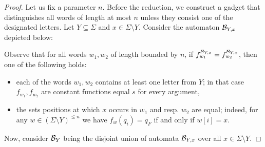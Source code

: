 \NPHardnessOfClash*
\begin{proof}
Let us fix a parameter $n$. Before the reduction, we construct a gadget that distinguishes all words of length at most $n$ unless they consist one of the designated letters. 
Let $Y \subseteq \Sigma$ and $x \in \Sigma \setminus Y$. Consider the automaton $\mathcal{B}_{Y,x}$ depicted below:

\begin{figure}[h!]
\centering
{}
\end{figure}

Observe that for all words $w_1, w_2$ of length bounded by $n$, if $f^{\mathcal{B}_{Y,x}}_{w_1} = f^{\mathcal{B}_{Y,x}}_{w_2}$, then one of the following holds:
\begin{itemize}
    \item each of the words $w_1, w_2$ contains at least one letter from $Y$; in that case $f_{w_1}, f_{w_2}$ are constant functions equal 
    $s$ for every argument,
    \item the sets positions at which $x$ occurs in $w_1$ and resp. $w_2$ are equal; 
    indeed, for any $w \in (\Sigma \setminus Y)^{\leq n}$ we have
    $f_{w}(q_i) = q_F$ if and only if $w[i] = x$.
\end{itemize}
Now, consider $\mathcal{B}_Y$ being the disjoint union of automata $\mathcal{B}_{Y,x}$ over all $x \in \Sigma\setminus Y$.


\end{proof}
